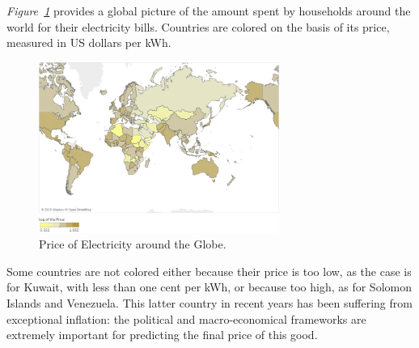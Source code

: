 \documentclass[a4paper,12pt]{book}
\begin{document}
\textit{Figure~\ref{fig:world_cost}} provides a global picture of the amount spent by households around the world for their electricity bills. Countries are colored on the basis of its price, measured in US dollars per kWh.

\begin{figure}[hbt]
\begin{center}
\includegraphics[width=0.7\textwidth]{Images/world2020.png}
\end{center}
\captionsetup{justification=centering}
\caption{Price of Electricity around the Globe.}
\label{fig:world_cost}
\end{figure}

Some countries are not colored either because their price is too low, as the case is for Kuwait, with less than one cent per kWh, or because too high, as for Solomon Islands and Venezuela. This latter country in recent years has been suffering from exceptional inflation: the political and macro-economical frameworks are extremely important for predicting the final price of this good.
\end{document}
